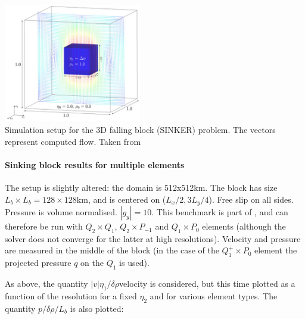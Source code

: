 \begin{center}
\includegraphics[width=6cm]{images/benchmark_sinker/fumt11}\\
{\captionfont Simulation setup for the 3D falling block (SINKER) problem. The vectors represent computed flow.
Taken from \cite{fumt11}}
\end{center}


\paragraph{Sinking block results for multiple elements}

The setup is slightly altered: the domain is 512x512km. 
The block has size $L_b\times L_b=128\times 128$km, and is centered
on ($L_x/2,3L_y/4$). Free slip on all sides. Pressure is volume normalised. $|g_y|=10$.
This benchmark is part of \aspect, and can therefore be run with $Q_2\times Q_1$, $Q_2\times P_{-1}$ and $Q_1\times P_0$ elements (although the solver does not converge for the latter at high resolutions).
Velocity and pressure are measured in the middle of the block (in the case of the $Q_1^+\times P_0$ element the 
projected pressure $q$ on the $Q_1$ is used).

As above, the quantity $|v|\eta_1/\delta\rho$velocity is considered, but this time plotted as a function 
of the resolution for a fixed $\eta_2$ and for various element types. The quantity $p/\delta\rho/L_b$
is also plotted:

